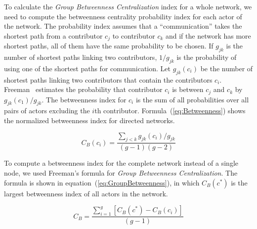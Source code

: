 \documentclass[12pt,oneside]{book}
\begin{document}
To calculate the \emph{Group Betweenness Centralization} index for a whole
network, we need to compute the betweenness centrality probability index for each
actor of the network. The probability index assumes that a ``communication''
takes the shortest path from a contributor $c_j$ to contributor $c_k$ and if the
network has more shortest paths, all of them have the same probability to be
chosen. If $g_{jk}$ is the number of shortest paths linking two contributors,
$1/g_{jk}$ is the probability of using one of the shortest paths for
communication. Let $g_{jk}(c_i)$ be the number of shortest paths linking two
contributors that contain the contributors $c_i$. Freeman~\cite{Freeman:1979rl}
estimates the probability that contributor $c_i$ is between $c_j$ and $c_k$ by
$g_{jk}(c_1)/g_{jk}$. The betweenness index for $c_i$ is the sum of all
probabilities over all pairs of actors excluding the $i$th contributor.
Formula~(\ref{eq:Betweenness}) shows the normalized betweenness index for
directed networks.

\begin{equation}
\displaystyle C_B(c_i) =  \frac{\sum_{j<k} g_{jk}(c_i)/g_{jk}}{(g-1)(g-2)}
\label{eq:Betweenness}
\end{equation}

To compute a betweenness index for the complete network instead of a single node,
we used Freeman's formula for \emph{Group Betweenness Centralization}. The
formula is shown in equation~(\ref{eq:GroupBetweenness}), in which $C_B(c^*)$ is
the largest betweenness index of all actors in the network.

\begin{equation}
\displaystyle C_B =  \frac{\sum_{i=1}^g[C_B(c^*)-C_B(c_i)]}{(g-1)}
\label{eq:GroupBetweenness}
\end{equation}
\end{document}
